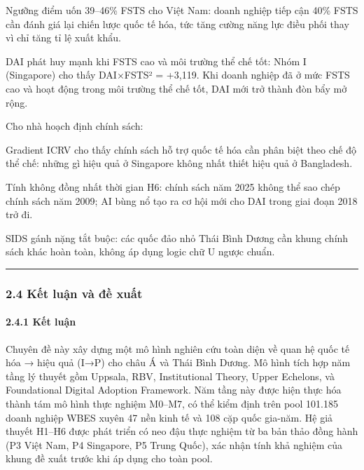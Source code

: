 \documentclass[12pt,a4paper]{article}
\begin{document}
Ngưỡng điểm uốn 39--46\% FSTS cho Việt Nam: doanh nghiệp tiếp cận 40\%
FSTS cần đánh giá lại chiến lược quốc tế hóa, tức tăng cường năng lực
điều phối thay vì chỉ tăng tỉ lệ xuất khẩu.

DAI phát huy mạnh khi FSTS cao và môi trường thể chế tốt: Nhóm I
(Singapore) cho thấy DAI×FSTS² = +3,119. Khi doanh nghiệp đã ở mức FSTS
cao và hoạt động trong môi trường thể chế tốt, DAI mới trở thành đòn bẩy
mở rộng.

Cho nhà hoạch định chính sách:

Gradient ICRV cho thấy chính sách hỗ trợ quốc tế hóa cần phân biệt theo
chế độ thể chế: những gì hiệu quả ở Singapore không nhất thiết hiệu quả
ở Bangladesh.

Tính không đồng nhất thời gian H6: chính sách năm 2025 không thể sao
chép chính sách năm 2009; AI bùng nổ tạo ra cơ hội mới cho DAI trong
giai đoạn 2018 trở đi.

SIDS gánh nặng tắt buộc: các quốc đảo nhỏ Thái Bình Dương cần khung
chính sách khác hoàn toàn, không áp dụng logic chữ U ngược chuẩn.

\begin{center}\rule{0.5\linewidth}{0.5pt}\end{center}

\hypertarget{24-kux1ebft-luux1eadn-vuxe0-ux111ux1ec1-xuux1ea5t}{%
\subsubsection{2.4 Kết luận và đề
xuất}\label{24-kux1ebft-luux1eadn-vuxe0-ux111ux1ec1-xuux1ea5t}}

\hypertarget{241-kux1ebft-luux1eadn}{%
\paragraph{2.4.1 Kết luận}\label{241-kux1ebft-luux1eadn}}

Chuyên đề này xây dựng một mô hình nghiên cứu toàn diện về quan hệ quốc
tế hóa → hiệu quả (I→P) cho châu Á và Thái Bình Dương. Mô hình tích hợp
năm tầng lý thuyết gồm Uppsala, RBV, Institutional Theory, Upper
Echelons, và Foundational Digital Adoption Framework. Năm tầng này được
hiện thực hóa thành tám mô hình thực nghiệm M0--M7, có thể kiểm định
trên pool 101.185 doanh nghiệp WBES xuyên 47 nền kinh tế và 108 cặp quốc
gia-năm. Hệ giả thuyết H1--H6 được phát triển có neo đậu thực nghiệm từ
ba bản thảo đồng hành (P3 Việt Nam, P4 Singapore, P5 Trung Quốc), xác
nhận tính khả nghiệm của khung đề xuất trước khi áp dụng cho toàn pool.
\end{document}
